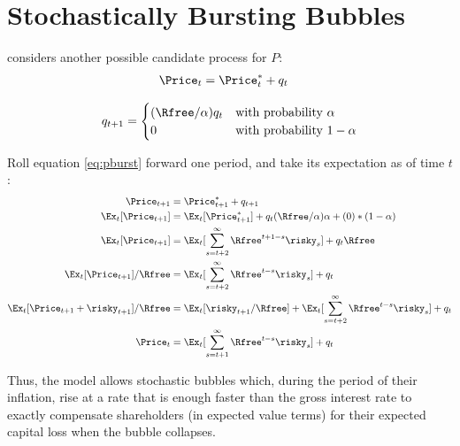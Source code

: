\documentclass{handout}
\begin{document}
\section{Stochastically Bursting Bubbles}

\cite{blanchard:burstingbubbles} considers another possible candidate process for $P$:
\begin{equation}\begin{gathered}\begin{aligned}
        \Price_{t} & =  \Price_{t}^{*}+q_{t} \label{eq:pburst}
\end{aligned}\end{gathered}\end{equation}

\begin{equation}
q_{t+1} = 
\begin{cases}
(\Rfree/\alpha)q_{t} & \text{with probability $\alpha$} \\
0               & \text{with probability $1-\alpha$}
\end{cases}
\end{equation}

Roll equation \eqref{eq:pburst} forward one period, and take its expectation
as of time $t$:
\begin{equation}\begin{gathered}\begin{aligned}
        \Price_{t+1} & =  \Price_{t+1}^{*}+q_{t+1}  \\
        \Ex_{t}[\Price_{t+1}] & =  \Ex_{t}[\Price_{t+1}^{*}]+ q_{t}(\Rfree/\alpha) \alpha + (0)*(1-\alpha) 
\\      \Ex_{t}[\Price_{t+1}] & =  \Ex_{t}[\sum_{s=t+2}^{\infty}\Rfree^{t+1-s}\risky_{s}]+ q_{t} \Rfree
\\      \Ex_{t}[\Price_{t+1}]/\Rfree & =  \Ex_{t}[\sum_{s=t+2}^{\infty}\Rfree^{t-s}\risky_{s}]+ q_{t}
\\      \Ex_{t}[\Price_{t+1}+\risky_{t+1}]/\Rfree & =  \Ex_{t}[\risky_{t+1}/\Rfree ] + \Ex_{t}[\sum_{s=t+2}^{\infty}\Rfree^{t-s}\risky_{s}]+ q_{t}
\\      \Price_{t} & =  \Ex_{t}[\sum_{s=t+1}^{\infty}\Rfree^{t-s}\risky_{s}]+ q_{t}
\end{aligned}\end{gathered}\end{equation}

Thus, the model allows stochastic bubbles which, during the period of 
their inflation, rise at a rate that is enough faster than the gross 
interest rate to exactly compensate shareholders (in expected value 
terms) for their expected capital loss when the bubble collapses.
\end{document}
